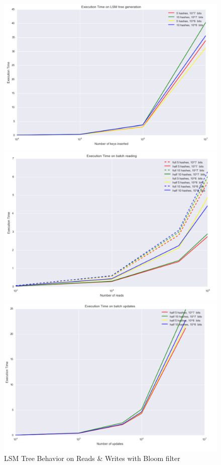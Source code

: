 \documentclass{sig-alternate-05-2015}
\begin{document}
\begin{figure}
   \begin{minipage}[b]{0.3\textwidth}
   \includegraphics[width=\textwidth]{bloom_gene}
  \end{minipage}
  \hfill
  \begin{minipage}[b]{0.3\textwidth}
    \includegraphics[width=\textwidth]{bloom_reading}
  \end{minipage}
  \hfill
  \begin{minipage}[b]{0.3\textwidth}
    \includegraphics[width=\textwidth]{bloom_updates}
  \end{minipage}
  \caption{LSM Tree Behavior on Reads \& Writes with Bloom filter}
  \label{fig:bloom}
\end{figure}
\end{document}
